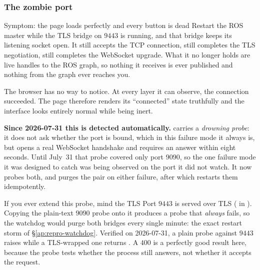 \subsubsection{The zombie port}
\begin{trapbox}{Symptom: the page loads perfectly and every button is dead}
Restart the ROS master while the TLS bridge on $9443$ is running, and that
bridge keeps its listening socket open. It still accepts the TCP connection,
still completes the TLS negotiation, still completes the WebSocket upgrade.
What it no longer holds are live handles to the ROS graph, so nothing it
receives is ever published and nothing from the graph ever reaches you.

The browser has no way to notice. At every layer it can observe, the
connection succeeded. The page therefore renders its ``connected'' state
truthfully and the interface looks entirely normal while being inert.
\end{trapbox}

\noindent\textbf{Since 2026-07-31 this is detected automatically.}
 carries a \emph{drowning probe}: it does not ask
whether the port is bound, which in this failure mode it always is, but opens
a real WebSocket handshake and requires an answer within eight seconds. Until
July~31 that probe covered only port $9090$, so the one failure mode it was
designed to catch was being observed on the port it did not watch. It now
probes both, and purges the pair on either failure, after which
 restarts them idempotently.

\begin{trapbox}{If you ever extend this probe, mind the TLS}
Port $9443$ is served over TLS ( in
). Copying the plain-text $9090$ probe
onto it produces a probe that \emph{always} fails, so the watchdog would purge
both bridges every single minute: the exact restart storm of
\S\ref{ap:repro-watchdog}. Verified on 2026-07-31, a plain probe against
$9443$ raises  while a TLS-wrapped one returns
. A $400$ is a perfectly good result here, because the
probe tests whether the process still answers, not whether it accepts the
request.
\end{trapbox}

